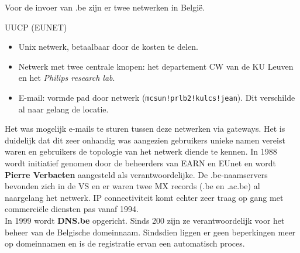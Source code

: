 \documentclass[../main.tex]{subfiles}
\begin{document}
\begin{solution}
Voor de invoer van .be zijn er twee netwerken in Belgi\"e.
	\item UUCP (EUNET)
	\begin{itemize}
		\item Unix netwerk, betaalbaar door de kosten te delen.
		\item Netwerk met twee centrale knopen: het departement CW van de  KU Leuven en het \emph{Philips research lab}.
		\item E-mail: vormde pad door netwerk (\texttt{mcsun!prlb2!kulcs!jean}). Dit verschilde al naar gelang de locatie.
\end{itemize}
Het was mogelijk e-mails te sturen tussen deze netwerken via gateways. Het is duidelijk dat dit zeer onhandig was aangezien gebruikers unieke namen vereist waren en gebruikers de topologie van het netwerk diende te kennen. In 1988 wordt initiatief genomen door de beheerders van EARN en EUnet en wordt \textbf{Pierre Verbaeten} aangesteld als verantwoordelijke. De .be-naamservers bevonden zich in de VS en er waren twee MX records (.be en .ac.be) al naargelang het netwerk. IP connectiviteit komt echter zeer traag op gang met commerci\"ele diensten pas vanaf 1994.\\
In 1999 wordt \textbf{DNS.be} opgericht. Sinds 200 zijn ze verantwoordelijk voor het beheer van de Belgische domeinnaam. Sindsdien liggen er geen beperkingen meer op domeinnamen en is de registratie ervan een automatisch proces.
\end{solution}
\end{document}
